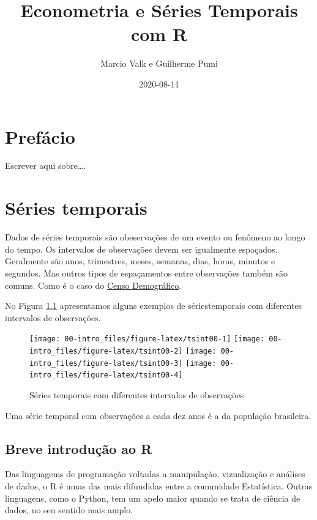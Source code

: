 \documentclass[
]{book}
\title{Econometria e Séries Temporais com R}
\author{Marcio Valk e Guilherme Pumi}
\date{2020-08-11}
\theoremstyle{definition}
\theoremstyle{definition}
\theoremstyle{definition}
\theoremstyle{remark}
\begin{document}
\maketitle

{
\setcounter{tocdepth}{1}
\tableofcontents
}
\hypertarget{prefuxe1cio}{%
\chapter*{Prefácio}\label{prefuxe1cio}}

Escrever aqui sobre\ldots.

\hypertarget{suxe9ries-temporais}{%
\chapter{Séries temporais}\label{suxe9ries-temporais}}

Dados de séries temporais são obeservações de um evento ou fenômeno ao longo do tempo. Os intervalos de observações devem ser igualmente espaçados. Geralmente são anos, trimestres, meses, semanas, dias, horas, minutos e segundos. Mas outros tipos de espaçamentos entre observações também são comuns. Como é o caso do \href{https://www.ibge.gov.br/estatisticas/sociais/populacao/22827-censo-2020-censo4.html}{Censo Demográfico}.

No Figura \ref{fig:tsint00} apresentamos alguns exemplos de sériestemporais com diferentes intervalos de observações.

\begin{figure}

{\centering \texttt{[image: 00-intro\_files/figure-latex/tsint00-1]} \texttt{[image: 00-intro\_files/figure-latex/tsint00-2]} \texttt{[image: 00-intro\_files/figure-latex/tsint00-3]} \texttt{[image: 00-intro\_files/figure-latex/tsint00-4]} 

}

\caption{Séries temporais com diferentes intervalos de observações}\label{fig:tsint00}
\end{figure}

Uma série temporal com observações a cada dez anos é a da população brasileira.

\hypertarget{intro}{%
\section{Breve introdução ao R}\label{intro}}

Das linguagems de programação voltadas a manipulação, vizualização e análises de dados, o R é umas das mais difundidas entre a comunidade Estatística. Outras linguagens, como o Python, tem um apelo maior quando se trata de ciência de dados, no seu sentido mais amplo.
\end{document}
